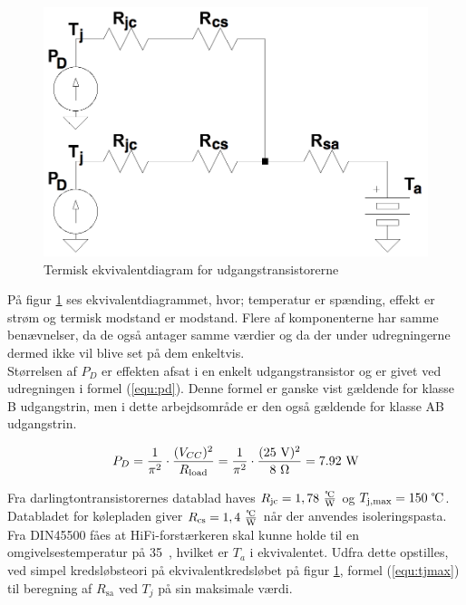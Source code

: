 \begin{figure}[h]
\centering
\includegraphics[scale=0.2]{teknisk/effektforstaerker/termisk_ekvivalentdiagram.png}
\caption{Termisk ekvivalentdiagram for udgangstransistorerne}
\label{fig:term-dia}
\end{figure}

På figur \ref{fig:term-dia} ses ekvivalentdiagrammet, hvor; temperatur er spænding, effekt er strøm og termisk modstand er modstand. Flere af komponenterne har samme benævnelser, da de også antager samme værdier og da der under udregningerne dermed ikke vil blive set på dem enkeltvis.\\
Størrelsen af $P_D$ er effekten afsat i en enkelt udgangstransistor og er givet ved udregningen i formel (\ref{equ:pd}). Denne formel er ganske vist gældende for klasse B udgangstrin, men i dette arbejdsområde er den også gældende for klasse AB udgangstrin.

\begin{equation}
\label{equ:pd}
P_D = \frac{1}{\pi^2} \cdot \frac{(V_{CC})^2}{R_{\mathrm{load}}} = \frac{1}{\pi^2} \cdot \frac{(25~\mathrm{V})^2}{8~\ohm} = 7.92~\mathrm{W}
\end{equation}

Fra darlingtontransistorernes datablad haves $R_{\mathrm{jc}} = 1,78~\tfrac{\celsius}{\mathrm{W}}$ og $T_{\mathrm{j,max}} = 150~\celsius$. Databladet for kølepladen giver $R_{\mathrm{cs}} = 1,4~\tfrac{\celsius}{\mathrm{W}}$ når der anvendes isoleringspasta. Fra DIN45500  fåes at HiFi-forstærkeren skal kunne holde til en omgivelsestemperatur på 35~\celsius, hvilket er $T_a$ i ekvivalentet. Udfra dette opstilles, ved simpel kredsløbsteori på ekvivalentkredsløbet på figur \ref{fig:term-dia}, formel (\ref{equ:tjmax}) til beregning af $R_{\mathrm{sa}}$ ved $T_j$  på sin maksimale værdi. 

